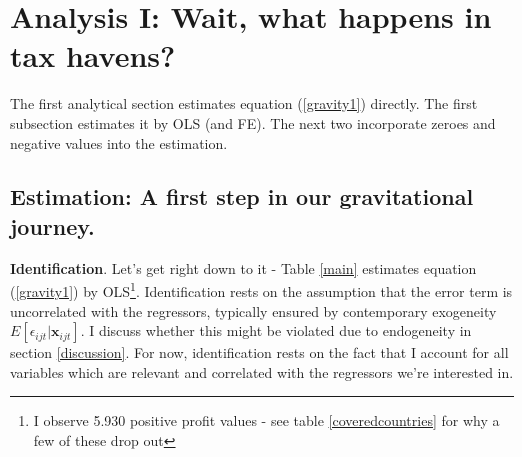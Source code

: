 \documentclass[twoside,a4paper,11pt]{article}
\begin{document}
\section{Analysis I: Wait, what happens in tax havens?}\label{analysisI}
The first analytical section estimates equation (\ref{gravity1}) directly. The first subsection estimates it by OLS (and FE). The next two incorporate zeroes and negative values into the estimation. 

\subsection{Estimation: A first step in our gravitational journey.}
\textbf{Identification}. Let's get right down to it - Table \ref{main} estimates equation (\ref{gravity1}) by OLS\footnote{I observe 5.930 positive profit values - see table \ref{coveredcountries} for why a few of these drop out}. Identification rests on the assumption that the error term is uncorrelated with the regressors, typically ensured by contemporary exogeneity $ E[\epsilon_{ijt}|\textbf{x}_{ijt}] $. I discuss whether this might be violated due to endogeneity in section \ref{discussion}. For now, identification rests on the fact that I account for  all variables which are relevant and correlated with the regressors we're interested in.  
\end{document}
